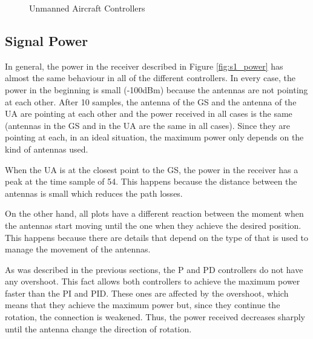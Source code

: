 \begin{figure}[H]
	\hfill
	\hfill
	\caption{Unmanned Aircraft Controllers}
	\label{fig:s1_ua}
\end{figure}

\subsection*{Signal Power}
In general, the power in the receiver described in Figure \ref{fig:s1_power} has almost the same behaviour in all of the different controllers. In every case, the power in the beginning is small (-100dBm) because the antennas are not pointing at each other. After 10 samples, the antenna of the GS and the antenna of the UA are pointing at each other and the power received in all cases is the same (antennas in the GS and in the UA are the same in all cases). Since they are pointing at each, in an ideal situation, the maximum power only depends on the kind of antennas used.

When the UA is at the closest point to the GS, the power in the receiver has a peak at the time sample of 54. This happens because the distance between the antennas is small which reduces the path losses.

On the other hand, all plots have a different reaction between the moment when the antennas start moving until the one when they achieve the desired position. This happens because there are details that depend on the type of that is used to manage the movement of the antennas. 

As was described in the previous sections, the P and PD controllers do not have any overshoot. This fact allows both controllers to achieve the maximum power faster than the PI and PID. These ones are affected by the overshoot, which means that they achieve the maximum power but, since they continue the rotation, the connection is weakened. Thus, the power received decreases sharply until the antenna change the direction of rotation.


